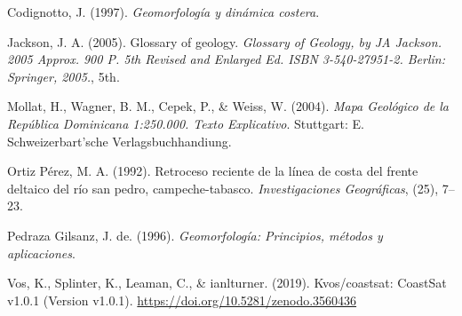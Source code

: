 \documentclass[11pt,]{article}
\begin{document}
\hypertarget{ref-codignotto1997geomorfologia}{}
Codignotto, J. (1997). \emph{Geomorfología y dinámica costera}.

\hypertarget{ref-jackson2005glossary}{}
Jackson, J. A. (2005). Glossary of geology. \emph{Glossary of Geology,
by JA Jackson. 2005 Approx. 900 P. 5th Revised and Enlarged Ed. ISBN
3-540-27951-2. Berlin: Springer, 2005.}, 5th.

\hypertarget{ref-mollat2004mapa}{}
Mollat, H., Wagner, B. M., Cepek, P., \& Weiss, W. (2004). \emph{Mapa
Geológico de la República Dominicana 1:250.000. Texto Explicativo}.
Stuttgart: E. Schweizerbart'sche Verlagsbuchhandiung.

\hypertarget{ref-ortiz1992retroceso}{}
Ortiz Pérez, M. A. (1992). Retroceso reciente de la línea de costa del
frente deltaico del río san pedro, campeche-tabasco.
\emph{Investigaciones Geográficas}, (25), 7--23.

\hypertarget{ref-pedraza1996geomorfologia}{}
Pedraza Gilsanz, J. de. (1996). \emph{Geomorfología: Principios, métodos
y aplicaciones}.

\hypertarget{ref-kilian_vos_2019_3560436}{}
Vos, K., Splinter, K., Leaman, C., \& ianlturner. (2019). Kvos/coastsat:
CoastSat v1.0.1 (Version v1.0.1).
\url{https://doi.org/10.5281/zenodo.3560436}




\newpage
\singlespacing 
\end{document}
